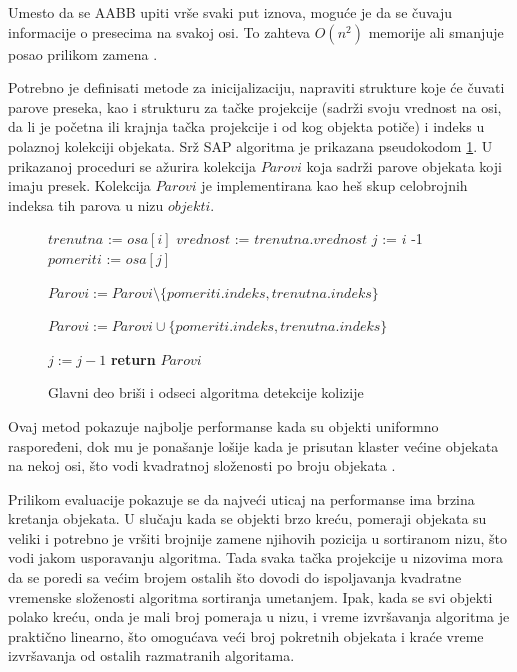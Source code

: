\documentclass[12pt,oneside]{memoir}
\begin{document}
Umesto da se AABB upiti vrše svaki put iznova, moguće je da se čuvaju informacije o presecima 
na svakoj osi. To zahteva $O(n^2)$ memorije ali smanjuje posao prilikom zamena \cite{sap}. 

Potrebno je definisati metode za inicijalizaciju, napraviti strukture koje će čuvati parove preseka,
kao i strukturu za tačke projekcije (sadrži svoju vrednost na osi, da li je početna ili krajnja tačka projekcije i od kog objekta potiče)
i indeks u polaznoj kolekciji objekata.
Srž SAP algoritma je prikazana pseudokodom \ref{alg:SAP}. 
U prikazanoj proceduri se ažurira kolekcija $Parovi$ koja sadrži parove objekata koji imaju presek. 
Kolekcija $Parovi$ je implementirana kao heš skup celobrojnih indeksa tih parova u nizu $objekti$.

\begin{figure}[!h]
    \label{alg:SAP}
	\begin{algorithmic}[1]
			\State $trenutna$ :=  $osa[i]$
			\State $vrednost$ := $trenutna.vrednost$
			\State $j$ := $i$ -1
				\State $pomeriti$ := $osa[j]$


					\State $Parovi := Parovi \setminus \{pomeriti.indeks, trenutna.indeks\}$
				\EndIf		

						\State $Parovi := Parovi \cup \{pomeriti.indeks, trenutna.indeks\}$
					\EndIf		
				\EndIf

				\State $j := j - 1$
			\EndWhile
		\EndFor
		\State \textbf{return} $Parovi$
		\EndProcedure
	\end{algorithmic}
	\caption{Glavni deo briši i odseci algoritma detekcije kolizije}
\end{figure}

Ovaj metod pokazuje najbolje performanse kada su objekti uniformno raspoređeni, dok mu je ponašanje lošije kada je
prisutan klaster većine objekata na nekoj osi, što vodi kvadratnoj složenosti po broju objekata \cite{sap}.

Prilikom evaluacije pokazuje se da najveći uticaj na performanse ima brzina kretanja objekata.
U slučaju kada se objekti brzo kreću, pomeraji objekata su veliki i potrebno je vršiti brojnije zamene njihovih pozicija u sortiranom nizu,
što vodi jakom usporavanju algoritma.
Tada svaka tačka projekcije u nizovima mora 
da se poredi sa većim brojem ostalih što dovodi do ispoljavanja kvadratne vremenske složenosti algoritma sortiranja umetanjem.
Ipak, kada se svi objekti polako kreću, onda je mali broj pomeraja u nizu, i vreme izvršavanja algoritma je praktično 
linearno, što omogućava veći broj pokretnih objekata i kraće vreme izvršavanja od ostalih razmatranih algoritama.
\end{document}
